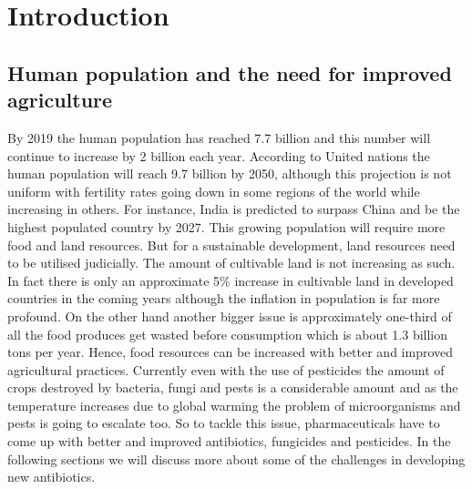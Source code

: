 \chapter{Introduction}
\label{chap:introduction}
\section{Human population and the need for improved agriculture}
By 2019 the human population has reached 7.7 billion and this number will continue to increase by 2 billion each year.
According to United nations the human population will reach 9.7 billion by 2050,
although this projection is not uniform with fertility rates going down in some regions of the world while increasing in others. \cite{population_2019}
For instance, India is predicted to surpass China and be the highest populated country by 2027. This growing population will require more food and land resources.\cite{population_2019}
But for a sustainable development, land resources need to be utilised judicially.
The amount of cultivable land is not increasing as such. In fact there is only an approximate 5\% increase in cultivable land in developed countries in the coming years although the inflation in population is far more profound.\cite{fao_agri} 
On the other hand another bigger issue is approximately one-third of all the food produces get wasted before consumption which is about 1.3 billion tons per year. \cite{fao_food_loss}
Hence, food resources can be increased with better and improved agricultural practices. 
Currently even with the use of pesticides the amount of crops destroyed by bacteria, fungi and
pests is a considerable amount and as the temperature increases due to global warming the problem of 
microorganisms and pests is going to escalate too.\cite{Gurr2013} 
So to tackle this issue, pharmaceuticals have to come up with better and improved antibiotics, fungicides and pesticides. In the following sections we will discuss more about some of the challenges in developing new 
antibiotics.

